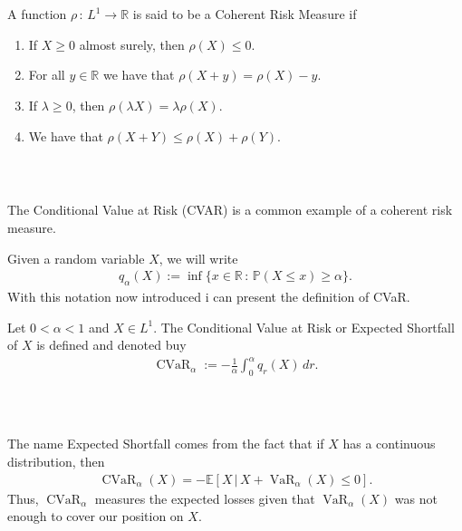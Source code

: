 \documentclass{beamer}
\numberwithin{equation}{section}
\DeclareMathOperator{\VaR}{VaR}
\DeclareMathOperator{\cvar}{CVaR}
\begin{document}
\begin{frame}\frametitle{{\normalsize \secname} \\ {\large \subsecname}}
    \begin{definition}
        A function $\rho \, : \, L^1 \rightarrow \mathbb{R}$ is said to be a Coherent Risk Measure if
        \begin{enumerate}
            \item If $X \geq 0$ almost surely, then $\rho(X) \leq 0$.
            \item For all $y \in \mathbb{R}$ we have that $\rho(X + y) = \rho(X) - y$.
            \item If $\lambda \geq 0$, then $\rho(\lambda X) = \lambda \rho(X)$.
            \item We have that $\rho(X + Y) \leq \rho(X) + \rho(Y)$.
        \end{enumerate}
    \end{definition}
\end{frame}

\begin{frame}\frametitle{{\normalsize \secname} \\ {\large \subsecname}}
    The Conditional Value at Risk (CVAR) is a common example of a coherent risk measure.

    Given a random variable $X$, we will write
    \begin{align}
        q_\alpha(X) := \inf \{x \in \mathbb{R} \, : \, \mathbb{P}(X \leq x) \geq \alpha\}.
    \end{align}
    With this notation now introduced i can present the definition of CVaR.
    \pause
    \begin{definition}
        Let $ 0 < \alpha < 1$ and $X \in L^1$.
        The Conditional Value at Risk or Expected Shortfall of $X$ is defined and denoted buy
        \begin{align}
            \cvar_\alpha := - \frac{1}{\alpha}\int_0^\alpha q_r(X) \, dr.
        \end{align}
    \end{definition}
\end{frame}

\begin{frame}\frametitle{{\normalsize \secname} \\ {\large \subsecname}}
    The name Expected Shortfall comes from the fact that if $X$ has a continuous distribution, then
    \begin{align}
        \cvar_\alpha(X) = - \mathbb{E}[X \, | \, X + \VaR_\alpha(X) \leq 0].
    \end{align}
    Thus, $\cvar_\alpha$ measures the expected losses given that $\VaR_\alpha(X)$ was not enough to cover our position on $X$.
\end{frame}
\end{document}
